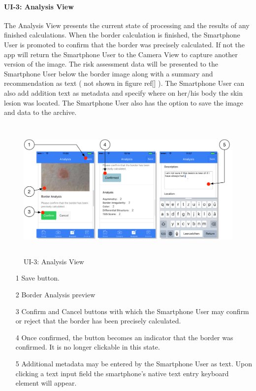             \paragraph{UI-3: Analysis View}

            The Analysis View presents the current state of processing and the results of any finished calculations. When the border calculation is finished, the Smartphone User is promoted to confirm that the border was precisely calculated. If not the app will return the Smartphone User to the Camera View to capture another version of the image. The risk assessment data will be presented to the Smartphone User below the border image along with a summary and recommendation as text ( not shown in figure ref[] ). The Smartphone User can also add addition text as metadata and specify where on her/his body the skin lesion was located. The Smartphone User also has the option to save the image and data to the archive.

                \begin{figure}[H]
                    \centering
                    \includegraphics[height=7cm]{assets/GUI/ANALYSIS.pdf}
                    \caption{UI-3: Analysis View}
                    \label{fig:ui-3}
                \end{figure}

                \begin{itemize}
                    \item[1] Save button.
                    \item[2] Border Analysis preview
                    \item[3] Confirm and Cancel buttons with which the Smartphone User may confirm or reject that the border has been precisely calculated.

                    \item[4] Once confirmed, the button becomes an indicator that the border was confirmed. It is no longer clickable in this state.

                    \item[5] Additional metadata may be entered by the Smartphone User as text. Upon clicking a text input field the smartphone’s native text entry keyboard element will appear.

                \end{itemize}

